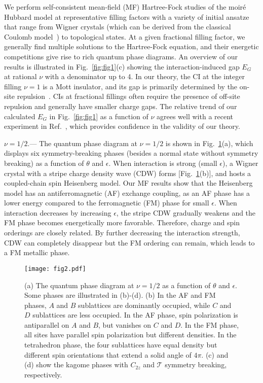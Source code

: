 \documentclass[aps,prl,floatfix,twocolumn]{revtex4-1}
\begin{document}
We perform self-consistent mean-field (MF) Hartree-Fock studies of the moir\'e Hubbard model at representative filling factors with a variety of initial ansatze that range from  Wigner crystals (which can be derived from the classical Coulomb model~\cite{SM}) to topological states. At a given fractional filling factor, we generally find multiple solutions to the Hartree-Fock equation, and their energetic competitions give rise to  rich quantum phase diagrams. An overview of our results is illustrated in Fig.~\ref{fig:fig1}(c) showing the interaction-induced gap $E_G$ at rational $\nu$ with a denominator up to 4. In our theory, the CI at the integer filling $\nu=1$ is a Mott insulator, and its gap is primarily determined by the on-site repulsion~\cite{pan2020band}. CIs at fractional fillings often require the presence of off-site repulsion and generally have smaller charge gaps. The relative trend of our  calculated $ E_G $ in Fig.~\ref{fig:fig1} as a function of $\nu$ agrees well with a recent experiment in Ref.~, which provides confidence in the validity of our theory.



$\nu=1/2$.--- The quantum phase diagram at $\nu=1/2$ is shown in Fig.~\ref{fig:fig2}(a), which displays six symmetry-breaking phases (besides a normal state without symmetry breaking) as a function of $\theta$ and $\epsilon$. When interaction is strong (small $\epsilon$), a Wigner crystal with a stripe charge density wave (CDW) forms  [Fig.~\ref{fig:fig2}(b)], and hosts a coupled-chain spin Heisenberg model. Our MF results show that the Heisenberg model has an antiferromagnetic (AF) exchange coupling, as an AF phase has a lower energy compared to the ferromagnetic (FM) phase for small $\epsilon$. When interaction decreases by increasing $\epsilon$, the stripe CDW gradually weakens and the FM phase becomes energetically more favorable. Therefore, charge and spin orderings are closely related. By further decreasing the interaction strength, CDW can completely disappear but the FM ordering can remain, which leads to a FM metallic phase. 

\begin{figure}[t]
	\centering
	\texttt{[image: fig2.pdf]}
	\caption{(a) The quantum phase diagram at $\nu=1/2$ as a function of $\theta$ and $\epsilon$. Some phases are illustrated in (b)-(d). (b) In the AF and FM phases, $A$ and $B$ sublattices are dominantly occupied, while $C$ and $D$ sublattices are less occupied. In the AF phase, spin polarization is antiparallel on $A$ and $B$, but vanishes on $C$ and $D$. In the FM phase, all sites have parallel spin polarization but different densities. In the tetrahedron phase, the four sublattices have equal density but different spin orientations that extend a solid angle of $4\pi$. (c) and (d)  show the kagome phases with $C_{2z}$ and $\mathcal{T}$ symmetry breaking, respectively.}
	\label{fig:fig2}
\end{figure}
\end{document}
